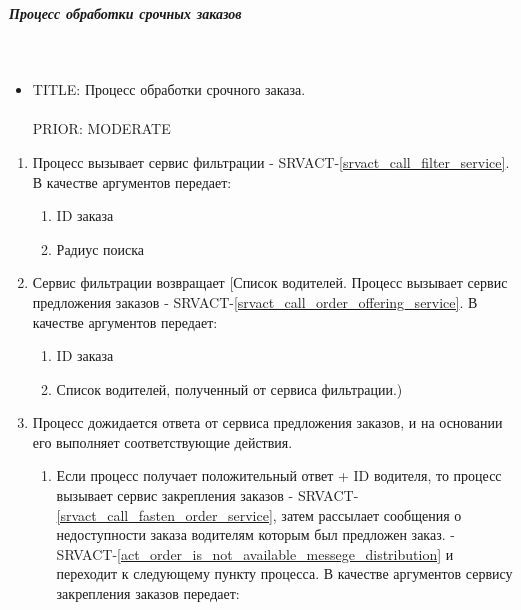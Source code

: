 \subparagraph{Процесс обработки срочных заказов} \mbox{} \\ \label{}

  \begin{itemize}

       \item {
         TITLE: Процесс обработки срочного заказа.\\
         \\
         PRIOR: MODERATE\\
       }

       \end{itemize}

  \begin{alg} \label{alg_urgent_order_processing} \mbox{}

      \begin{enumerate}

         	\item Процесс вызывает сервис фильтрации - SRVACT-\ref{srvact_call_filter_service}. В качестве аргументов передает:

         		\begin{enumerate}
         			\item ID заказа 
         			\item Радиус поиска 
         		\end{enumerate}

          \item Сервис фильтрации возвращает [Список водителей. Процесс вызывает сервис предложения заказов - SRVACT-\ref{srvact_call_order_offering_service}. В качестве аргументов передает:

         		\begin{enumerate}
         			\item ID заказа
         			\item Список водителей, полученный от сервиса фильтрации.)
         		\end{enumerate}
        
          \item Процесс дожидается ответа от сервиса предложения заказов, и на основании его выполняет соответствующие действия.
          
          	\begin{enumerate}
         			\item Если процесс получает положительный ответ + ID водителя, то процесс вызывает сервис закрепления заказов - SRVACT-\ref{srvact_call_fasten_order_service}, затем рассылает сообщения о недоступности заказа водителям которым был предложен заказ. -  SRVACT-\ref{act_order_is_not_available_messege_distribution} и переходит к следующему пункту процесса. В качестве аргументов сервису закрепления заказов передает: 


\end{enumerate}
\end{enumerate}
\end{alg}
